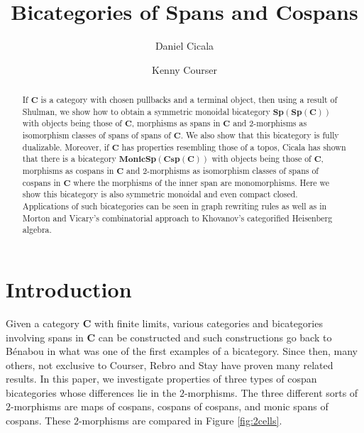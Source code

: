 \documentclass[11pt]{amsart}
\newcommand{\cat}[1]{\mathbf{#1}}
\theoremstyle{remark}
\theoremstyle{definition}
\begin{document}
\sloppy	

\begin{abstract}
If $\cat{C}$ is a category with chosen pullbacks and a terminal object, then using a result of Shulman, we show how to obtain a symmetric monoidal bicategory $\cat{Sp(Sp(C))}$ with objects being those of $\cat{C}$, morphisms as spans in $\cat{C}$ and 2-morphisms as isomorphism classes of spans of spans of $\cat{C}$. We also show that this bicategory is fully dualizable. Moreover, if $\cat{C}$ has properties resembling those of a topos, Cicala has shown that there is a bicategory $\cat{MonicSp(Csp(C))}$ with objects being those of $\cat{C}$, morphisms as cospans in $\cat{C}$ and 2-morphisms as isomorphism classes of spans of cospans in $\cat{C}$ where the morphisms of the inner span are monomorphisms. Here we show this bicategory is also symmetric monoidal and even compact closed. Applications of such bicategories can be seen in graph rewriting rules as well as in Morton and Vicary's combinatorial approach to Khovanov's categorified Heisenberg algebra.
\end{abstract}

\title{Bicategories of Spans and Cospans}
\author{Daniel Cicala \and Kenny Courser}
\maketitle

\section{Introduction} 
\label{sec:Introduction}

Given a category $\cat{C}$ with finite limits, various categories and bicategories involving spans in $\cat{C}$ can be constructed and such constructions go back to B\'enabou \cite{Be} in what was one of the first examples of a bicategory. Since then, many others, not exclusive to Courser, Rebro and Stay \cite{Cour,Reb,Stay} have proven many related results. In this paper, we investigate properties of three types of cospan bicategories whose differences lie in the $2$-morphisms.  The three different sorts of $2$-morphisms are maps of cospans, cospans of cospans, and monic spans of cospans.  These $2$-morphisms are compared in Figure \ref{fig:2cells}. 
\end{document}
